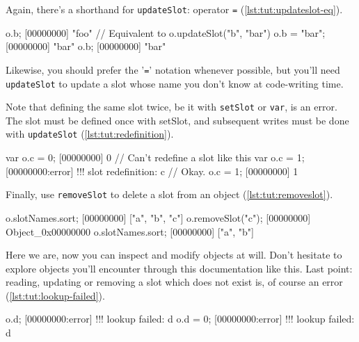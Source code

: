 Again, there's a shorthand for \lstinline{updateSlot}: operator
\lstinline{=} (\autoref{lst:tut:updateslot-eq}).

\begin{urbiscript}[caption=Updating a slot with '\lstinline{=}',
  label=lst:tut:updateslot-eq, name=object-slots]
o.b;
[00000000] "foo"
// Equivalent to o.updateSlot("b", "bar")
o.b = "bar";
[00000000] "bar"
o.b;
[00000000] "bar"
\end{urbiscript}

Likewise, you should prefer the '\lstinline{=}' notation whenever
possible, but you'll need \lstinline{updateSlot} to update a slot whose
name you don't know at code-writing time.

Note that defining the same slot twice, be it with \lstinline{setSlot} or
\lstinline{var}, is an error. The slot must be defined once with setSlot,
and subsequent writes must be done with \lstinline{updateSlot}
(\autoref{lst:tut:redefinition}).

\begin{urbiscript}[caption=Defining a slot twice is an error,
  label=lst:tut:redefinition, name=object-slots]
var o.c = 0;
[00000000] 0
// Can't redefine a slot like this
var o.c = 1;
[00000000:error] !!! slot redefinition: c
// Okay.
o.c = 1;
[00000000] 1
\end{urbiscript}

Finally, use \lstinline{removeSlot} to delete a slot from an object
(\autoref{lst:tut:removeslot}).

\begin{urbiscript}[caption=Removing a slot, label=lst:tut:removeslot,
  name=object-slots]
o.slotNames.sort;
[00000000] ["a", "b", "c"]
o.removeSlot("c");
[00000000] Object_0x00000000
o.slotNames.sort;
[00000000] ["a", "b"]
\end{urbiscript}

Here we are, now you can inspect and modify objects at will. Don't
hesitate to explore \us objects you'll encounter through this
documentation like this. Last point: reading, updating or removing a
slot which does not exist is, of course an error
(\autoref{lst:tut:lookup-failed}).

\begin{urbiscript}[caption=Manipulating nonexistent slot is an error,
  label=lst:tut:lookup-failed, name=object-slots]
o.d;
[00000000:error] !!! lookup failed: d
o.d = 0;
[00000000:error] !!! lookup failed: d
\end{urbiscript}

